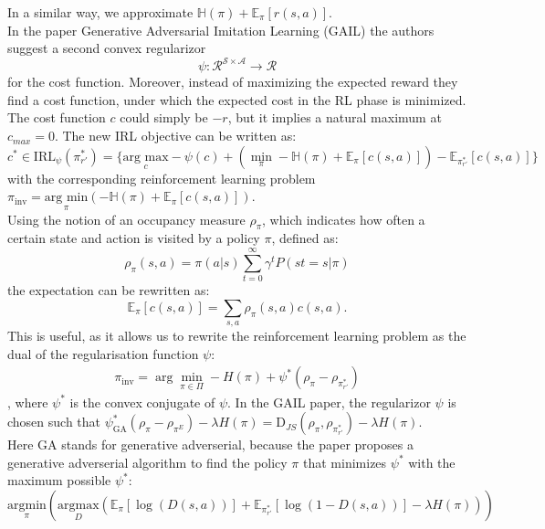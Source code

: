 In a similar way, we approximate $\mathbb{H}(\pi) + \mathbb{E}_{\pi}[r(s, a)]$.\\
In the paper Generative Adversarial Imitation Learning (GAIL) \cite{GAIL} the authors suggest a second convex regularizor 
$$\psi : \mathcal{R}^{\mathcal{S} \times \mathcal{A}}\rightarrow \mathcal{R}$$ for the cost function. Moreover, instead of maximizing the expected reward they find a cost function, under which 
the expected cost in the RL phase is minimized. The cost function $c$ could simply be $-r$, but it implies a natural maximum at $c_{max} = 0$.
The new IRL objective can be written as:
\begin{equation}
    c^* \in \text{IRL}_{\psi}(\pi_{r'}^*) = \{\underset{c}{\text{arg max}} -\psi(c) + \left(
        \min_{\pi} - \mathbb{H}(\pi) + \mathbb{E}_{\pi}[c(s,a)] \right) - 
        \mathbb{E}_{\pi_{r'}^*}[c(s,a)] \}
\end{equation}
with the corresponding reinforcement learning problem $\pi_{\text{inv}} = \underset{\pi}{\text{arg min}} (- \mathbb{H}(\pi) + \mathbb{E}_{\pi}[c(s,a)])$.\\
Using the notion of an occupancy measure $\rho_{\pi}$, which indicates how often a certain state and action is visited by a policy $\pi$, defined as:
\begin{equation}
    \rho_{\pi}(s, a) = \pi(a|s) \sum_{t=0}^{\infty} \gamma^{t} P(st = s | \pi)
\end{equation}
the expectation can be rewritten as:
\begin{equation}
    \mathbb{E}_{\pi}[c(s,a)] = \sum_{s,a} \rho_{\pi}(s,a) c(s,a).
\end{equation}
This is useful, as it allows us to rewrite the reinforcement learning problem as the dual of the regularisation function $\psi$:
\begin{align}
    \pi_{\text{inv}} = \arg\min_{\pi \in \Pi} -H(\pi) + \psi^*(\rho_{\pi} - \rho_{\pi_{r'}^*})
\end{align}
, where $\psi^*$ is the convex conjugate of $\psi$. 
In the GAIL paper, the regularizor $\psi$ is chosen such that  $\psi^*_{\text{GA}}(\rho_{\pi} - \rho_{\pi^E}) - \lambda H(\pi) = \text{D}_{JS}(\rho_{\pi}, \rho_{\pi_{r'}^*}) - \lambda H(\pi)$.\\
Here GA stands for generative adverserial, because the paper proposes a generative adverserial algorithm to find the policy $\pi$ that minimizes $\psi^*$ with the maximum possible $\psi^*$:
\begin{equation}
    \underset{\pi}{\text{argmin}} \left( \underset{D}{\text{argmax}} (\mathbb{E}_{\pi}[\log(D(s,a))] + \mathbb{E}_{\pi_{r'}^*}[\log(1-D(s,a))] - \lambda H(\pi)) \right)
\end{equation}
